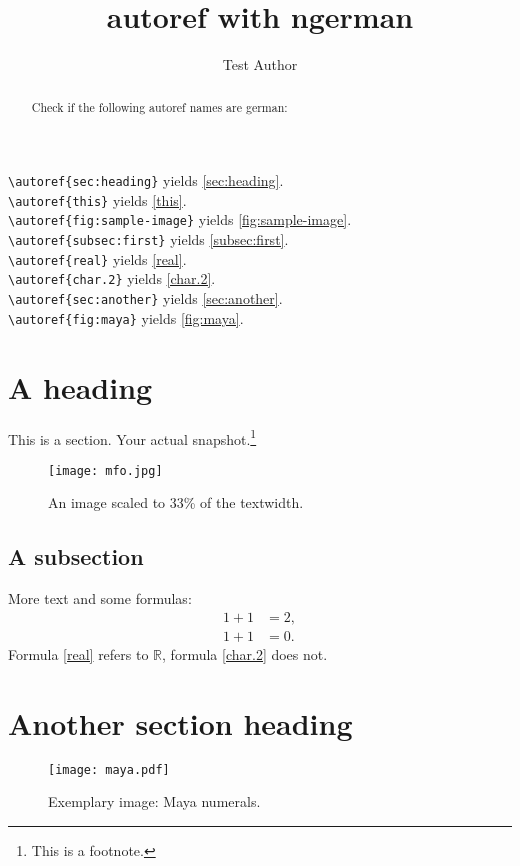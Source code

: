 \documentclass{snapshotmfo}
\author{Test Author}
\title{autoref with ngerman}
\begin{document}
\begin{abstract}
Check if the following autoref names are german:
\end{abstract}

\noindent \verb+\autoref{sec:heading}+ yields \autoref{sec:heading}.\\
\verb+\autoref{this}+ yields \autoref{this}.\\
\verb+\autoref{fig:sample-image}+ yields \autoref{fig:sample-image}.\\
\verb+\autoref{subsec:first}+ yields \autoref{subsec:first}.\\
\verb+\autoref{real}+ yields \autoref{real}.\\
\verb+\autoref{char.2}+ yields \autoref{char.2}.\\
\verb+\autoref{sec:another}+ yields \autoref{sec:another}.\\
\verb+\autoref{fig:maya}+ yields \autoref{fig:maya}.\\


\section{A heading}
\label{sec:heading}
This is a section.
Your actual snapshot.\footnote{This is a footnote.\label{this}}

\begin{figure}[ht]
        \centering 
        \texttt{[image: mfo.jpg]}
        \caption{An image scaled to 33\% of the textwidth.}
\label{fig:sample-image}
\end{figure}

\subsection{A subsection}
\label{subsec:first}
More text and some formulas:
\begin{align}\label{real}
1+1&=2,\\\label{char.2}
1+1&=0.
\end{align}
Formula \eqref{real} refers to $\mathbb{R}$, formula \eqref{char.2} does not.


\section{Another section heading}
\label{sec:another}

\begin{figure}[ht]
        \centering 
        \texttt{[image: maya.pdf]}
        \caption{Exemplary image: Maya numerals.}
\label{fig:maya}
\end{figure}
\end{document}
